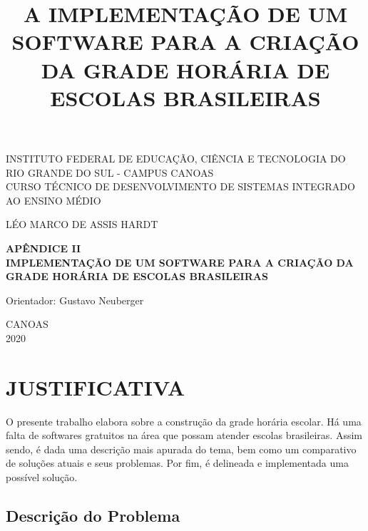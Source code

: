 \documentclass[12pt,a4paper]{article}
\title{A IMPLEMENTAÇÃO DE UM SOFTWARE PARA A CRIAÇÃO DA GRADE HORÁRIA DE ESCOLAS BRASILEIRAS}
\newenvironment{bottompar}{\par\vspace*{\fill}}{\clearpage}
\begin{document}
		\thispagestyle{empty}

		\begin{center}
			INSTITUTO FEDERAL DE EDUCAÇÃO, CIÊNCIA E TECNOLOGIA DO RIO GRANDE DO SUL - CAMPUS CANOAS \\
			CURSO TÉCNICO DE DESENVOLVIMENTO DE SISTEMAS INTEGRADO AO ENSINO MÉDIO\\
		\end{center}

		\vskip 3cm

		\begin{center}
			LÉO MARCO DE ASSIS HARDT
		\end{center}

		\vskip 3cm

		\begin{center}
			\textbf{APÊNDICE II\\IMPLEMENTAÇÃO DE UM SOFTWARE PARA A CRIAÇÃO DA GRADE HORÁRIA DE ESCOLAS BRASILEIRAS}
		\end{center}

		\vskip 3cm

		\begin{center}
			Orientador: Gustavo Neuberger
		\end{center}

		\begin{bottompar}
			\begin{center}
			CANOAS \\
			2020
			\end{center}
		\end{bottompar}

    \section{JUSTIFICATIVA}

		O presente trabalho elabora sobre a construção da grade horária escolar. Há uma falta de softwares gratuitos na área que possam atender escolas brasileiras. Assim sendo, é dada uma descrição mais apurada do tema, bem como um comparativo de soluções atuais e seus problemas. Por fim, é delineada e implementada uma possível solução.

		\subsection{Descrição do Problema}
\end{document}
